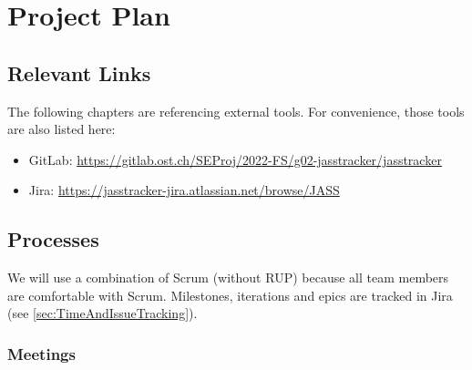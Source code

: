 \chapter{Project Plan}


\section{Relevant Links}

The following chapters are referencing external tools. For convenience, those tools are also listed here:

\begin{itemize}
    \item GitLab: \url{https://gitlab.ost.ch/SEProj/2022-FS/g02-jasstracker/jasstracker}
    \item Jira: \url{https://jasstracker-jira.atlassian.net/browse/JASS}
\end{itemize}

\section{Processes}

We will use a combination of Scrum (without RUP) because all team members are comfortable with Scrum.
Milestones, iterations and epics are tracked in Jira (see \ref{sec:TimeAndIssueTracking}).

\subsection*{Meetings}

